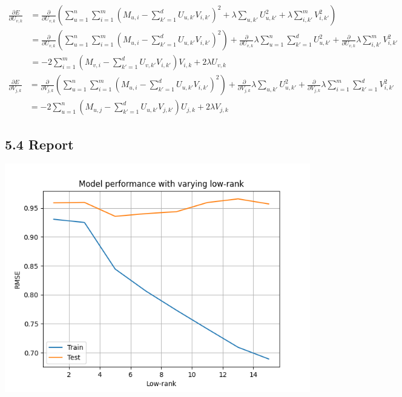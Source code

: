 \documentclass{article}
\begin{document}
\begin{align*}
    \frac{\partial E}{\partial U_{v,k}} &= \frac{\partial}{\partial U_{v,k}}\left(\sum_{u=1}^n\sum_{i=1}^m{(M_{u,i} - \sum_{k'=1}^d{U_{u,k'}V_{i,k'}})^2} + \lambda\sum_{u, k'}{U_{u,k'}^2} + \lambda\sum_{i,k'}^m{V_{i,k'}^2}\right)\\
    &= \frac{\partial}{\partial U_{v,k}}\left(\sum_{u=1}^n\sum_{i=1}^m{(M_{u,i} - \sum_{k'=1}^d{U_{u,k'}V_{i,k'}})^2}\right) + \frac{\partial}{\partial U_{v,k}}\lambda\sum_{u=1}^n\sum_{k'=1}^d{U_{u,k'}^2} + \frac{\partial}{\partial U_{v,k}}\lambda\sum_{i,k'}^m{V_{i,k'}^2}\\
    &= -2\sum_{i=1}^m{(M_{v,i} - \sum_{k'=1}^d{U_{v,k'}V_{i,k'}})V_{i,k}} + 2\lambda U_{v,k}
\end{align*}
\begin{align*}
    \frac{\partial E}{\partial V_{j,k}} &= \frac{\partial}{\partial V_{j,k}}\left(\sum_{u=1}^n\sum_{i=1}^m{(M_{u,i} - \sum_{k'=1}^d{U_{u,k'}V_{i,k'}})^2}\right) + \frac{\partial}{\partial V_{j,k}}\lambda\sum_{u, k'}{U_{u,k'}^2} + \frac{\partial}{\partial V_{j,k}}\lambda\sum_{i=1}^m\sum_{k'=1}^d{V_{i,k'}^2}\\
    &= -2\sum_{u=1}^n{(M_{u,j} - \sum_{k'=1}^d{U_{u,k'}V_{j,k'}})U_{j,k}} + 2\lambda V_{j,k}
\end{align*}

\subsection{5.4 Report}

\includegraphics[width=\textwidth]{evaluate}
\end{document}
